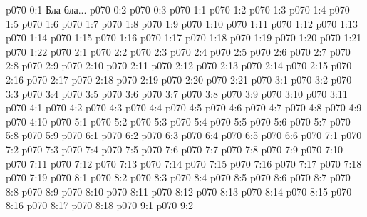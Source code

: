 \author{Мелхиседек}
\vs p070 0:1  Бла-бла...
\vs p070 0:2 
\vs p070 0:3 
\vs p070 1:1 
\vs p070 1:2 
\vs p070 1:3 
\vs p070 1:4 
\vs p070 1:5 
\vs p070 1:6 
\vs p070 1:7 \pc 
\vs p070 1:8 
\vs p070 1:9 
\vs p070 1:10 
\vs p070 1:11 
\vs p070 1:12 
\vs p070 1:13 
\vs p070 1:14 
\vs p070 1:15 \pc 
\vs p070 1:16 
\vs p070 1:17 \pc 
\vs p070 1:18 
\vs p070 1:19 
\vs p070 1:20 
\vs p070 1:21 
\vs p070 1:22 
\vs p070 2:1 
\vs p070 2:2 
\vs p070 2:3 \pc 
\vs p070 2:4 
\vs p070 2:5 
\vs p070 2:6 
\vs p070 2:7 
\vs p070 2:8 
\vs p070 2:9 \pc 
\vs p070 2:10 
\vs p070 2:11 
\vs p070 2:12 
\vs p070 2:13 
\vs p070 2:14 
\vs p070 2:15 
\vs p070 2:16 
\vs p070 2:17 
\vs p070 2:18 \pc 
\vs p070 2:19 
\vs p070 2:20 
\vs p070 2:21 
\vs p070 3:1 
\vs p070 3:2 
\vs p070 3:3 \pc 
\vs p070 3:4 
\vs p070 3:5 
\vs p070 3:6 \pc 
\vs p070 3:7 
\vs p070 3:8 
\vs p070 3:9 
\vs p070 3:10 
\vs p070 3:11 
\vs p070 4:1 
\vs p070 4:2 
\vs p070 4:3 
\vs p070 4:4 
\vs p070 4:5 
\vs p070 4:6 
\vs p070 4:7 
\vs p070 4:8 
\vs p070 4:9 \pc 
\vs p070 4:10 
\vs p070 5:1 
\vs p070 5:2 
\vs p070 5:3 
\vs p070 5:4 
\vs p070 5:5 \pc 
\vs p070 5:6 \pc 
\vs p070 5:7 
\vs p070 5:8 
\vs p070 5:9 
\vs p070 6:1 
\vs p070 6:2 
\vs p070 6:3 
\vs p070 6:4 
\vs p070 6:5 
\vs p070 6:6 \pc 
{}
\vs p070 7:1 
\vs p070 7:2 \pc 
\vs p070 7:3 
\vs p070 7:4 
\vs p070 7:5 
\vs p070 7:6 
\vs p070 7:7 \pc 
\vs p070 7:8 \pc 
\vs p070 7:9 
\vs p070 7:10 
\vs p070 7:11 
\vs p070 7:12 
\vs p070 7:13 \pc 
\vs p070 7:14 
\vs p070 7:15 \pc 
\vs p070 7:16 
\vs p070 7:17 
\vs p070 7:18 
\vs p070 7:19 
\vs p070 8:1 
\vs p070 8:2 
\vs p070 8:3 
\vs p070 8:4 
\vs p070 8:5 
\vs p070 8:6 
\vs p070 8:7 
\vs p070 8:8 
\vs p070 8:9 
\vs p070 8:10 
\vs p070 8:11 
\vs p070 8:12 
\vs p070 8:13 \pc 
\vs p070 8:14 
\vs p070 8:15 
\vs p070 8:16 
\vs p070 8:17 
\vs p070 8:18 \pc 
{}
\vs p070 9:1 
\vs p070 9:2 \pc 
